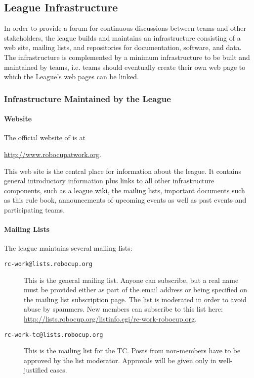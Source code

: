 \subsection{League Infrastructure}
In order to provide a forum for continuous discussions between teams and other stakeholders, the league builds and maintains an infrastructure consisting of a web site, mailing lists, and repositories for documentation, software, and data. The infrastructure is complemented by a minimum infrastructure to be built and maintained by teams, i.e. teams should eventually create their own web page to which the \RCAW League's web pages can be linked.

\subsubsection{Infrastructure Maintained by the League}

\paragraph{Website}
The official website of \RCAW is at
\begin{center}
\url{http://www.robocupatwork.org}.	
\end{center}

This web site is the central place for information about the league. It contains general introductory information plus links to all other infrastructure components, such as a league wiki, the mailing lists, important documents such as this rule book, announcements of upcoming events as well as past events and participating teams.

\paragraph{Mailing Lists}
The league maintains several mailing lists:
\begin{description}
	\item[\texttt{rc-work@lists.robocup.org}] This is the general \RCAW mailing list. Anyone can subscribe, but a real name must be provided either as part of the email address or being specified on the mailing list subscription page. The list is moderated in order to avoid abuse by spammers. New members can subscribe to this list here: \url{http://lists.robocup.org/listinfo.cgi/rc-work-robocup.org}.

	\item[\texttt{rc-work-tc@lists.robocup.org}] This is the mailing list for the TC. Posts from non-members have to be approved by the list moderator. Approvals will be given only in well-justified cases.
\end{description}

